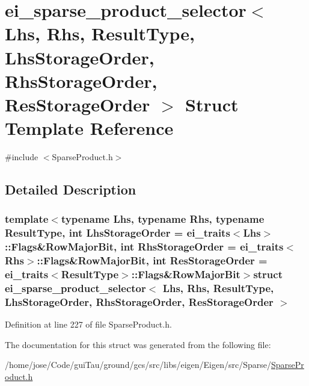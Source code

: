 \hypertarget{structei__sparse__product__selector}{\section{ei\-\_\-sparse\-\_\-product\-\_\-selector$<$ Lhs, Rhs, Result\-Type, Lhs\-Storage\-Order, Rhs\-Storage\-Order, Res\-Storage\-Order $>$ Struct Template Reference}
\label{structei__sparse__product__selector}
}


{\ttfamily \#include $<$Sparse\-Product.\-h$>$}



\subsection{Detailed Description}
\subsubsection*{template$<$typename Lhs, typename Rhs, typename Result\-Type, int Lhs\-Storage\-Order = ei\-\_\-traits$<$\-Lhs$>$\-::\-Flags\&\-Row\-Major\-Bit, int Rhs\-Storage\-Order = ei\-\_\-traits$<$\-Rhs$>$\-::\-Flags\&\-Row\-Major\-Bit, int Res\-Storage\-Order = ei\-\_\-traits$<$\-Result\-Type$>$\-::\-Flags\&\-Row\-Major\-Bit$>$struct ei\-\_\-sparse\-\_\-product\-\_\-selector$<$ Lhs, Rhs, Result\-Type, Lhs\-Storage\-Order, Rhs\-Storage\-Order, Res\-Storage\-Order $>$}



Definition at line 227 of file Sparse\-Product.\-h.



The documentation for this struct was generated from the following file\-:\begin{DoxyCompactItemize}
\item 
/home/jose/\-Code/gui\-Tau/ground/gcs/src/libs/eigen/\-Eigen/src/\-Sparse/\hyperlink{_sparse_product_8h}{Sparse\-Product.\-h}\end{DoxyCompactItemize}
